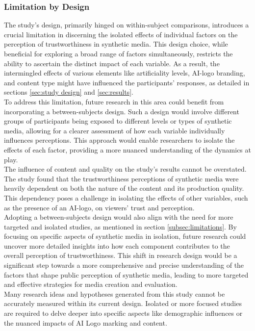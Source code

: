 \documentclass[
  a4paper,  %
  twoside,  %
  bibliography=totoc,
  headsepline,
  cleardoublepage=empty,
  parskip=half,
  draft=false
]{scrbook}
\begin{document}
\subsubsection{Limitation by Design}
The study's design, primarily hinged on within-subject comparisons, introduces a crucial limitation in discerning the isolated effects of individual factors on the perception of trustworthiness in synthetic media. This design choice, while beneficial for exploring a broad range of factors simultaneously, restricts the ability to ascertain the distinct impact of each variable. As a result, the intermingled effects of various elements like artificiality levels, AI-logo branding, and content type might have influenced the participants' responses, as detailed in sections \ref{sec:study design} and \ref{sec:results}. \\
To address this limitation, future research in this area could benefit from incorporating a between-subjects design. Such a design would involve different groups of participants being exposed to different levels or types of synthetic media, allowing for a clearer assessment of how each variable individually influences perceptions. This approach would enable researchers to isolate the effects of each factor, providing a more nuanced understanding of the dynamics at play. \\
The influence of content and quality on the study's results cannot be overstated. The study found that the trustworthiness perceptions of synthetic media were heavily dependent on both the nature of the content and its production quality. This dependency poses a challenge in isolating the effects of other variables, such as the presence of an AI-logo, on viewers' trust and perception. \\
Adopting a between-subjects design would also align with the need for more targeted and isolated studies, as mentioned in section \ref{subsec:limitations}. By focusing on specific aspects of synthetic media in isolation, future research could uncover more detailed insights into how each component contributes to the overall perception of trustworthiness. This shift in research design would be a significant step towards a more comprehensive and precise understanding of the factors that shape public perception of synthetic media, leading to more targeted and effective strategies for media creation and evaluation. \\

Many research ideas and hypotheses generated from this study cannot be accurately measured within its current design. Isolated or more focused studies are required to delve deeper into specific aspects like demographic influences or the nuanced impacts of AI Logo marking and content.
\end{document}
